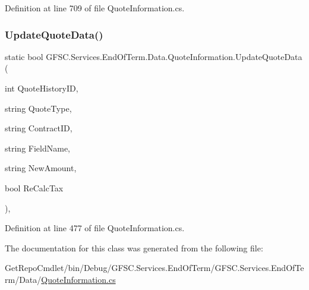 Definition at line 709 of file Quote\+Information.\+cs.

\mbox{\label{class_g_f_s_c_1_1_services_1_1_end_of_term_1_1_data_1_1_quote_information_a031811de298c7cdd12b7376c6140c086}} 
\subsubsection{\texorpdfstring{Update\+Quote\+Data()}{UpdateQuoteData()}}
{\footnotesize\ttfamily static bool G\+F\+S\+C.\+Services.\+End\+Of\+Term.\+Data.\+Quote\+Information.\+Update\+Quote\+Data (\begin{DoxyParamCaption}\item[{int}]{Quote\+History\+ID,  }\item[{string}]{Quote\+Type,  }\item[{string}]{Contract\+ID,  }\item[{string}]{Field\+Name,  }\item[{string}]{New\+Amount,  }\item[{bool}]{Re\+Calc\+Tax }\end{DoxyParamCaption})\hspace{0.3cm}{\ttfamily [static]}, {\ttfamily [package]}}



Definition at line 477 of file Quote\+Information.\+cs.



The documentation for this class was generated from the following file\+:\begin{DoxyCompactItemize}
\item 
Get\+Repo\+Cmdlet/bin/\+Debug/\+G\+F\+S\+C.\+Services.\+End\+Of\+Term/\+G\+F\+S\+C.\+Services.\+End\+Of\+Term/\+Data/\mbox{\hyperlink{_data_2_quote_information_8cs}{Quote\+Information.\+cs}}\end{DoxyCompactItemize}
